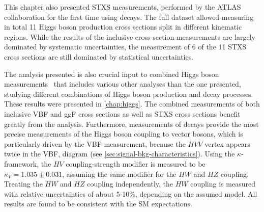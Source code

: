 This chapter also presented STXS measurements, performed by the ATLAS collaboration for the first time using \HWW decays. 
The full \RunTwo dataset allowed measuring in total 11 Higgs boson production cross sections split in different kinematic regions. 
While the results of the inclusive cross-section measurements are largely dominated by systematic uncertainties, the measurement of 6 of the 11 STXS cross sections are still dominated by statistical uncertainties. 

The analysis presented is also crucial input to combined Higgs boson measurements~\cite{NaturePaper} that includes various other analyses than the one presented, studying different combinations of Higgs boson production and decay processes.
These results were presented in \cref{chap:higgs}.
The combined measurements of both inclusive VBF and ggF cross sections as well as STXS cross sections benefit greatly from the \HWW analysis.
Furthermore, measurements of \HWW decays provide the most precise measurements of the Higgs boson coupling to vector bosons, which is particularly driven by the VBF measurement, because the $HVV$ vertex appears twice in the VBF, \HWW diagram (see \cref{sec:signal-bkg-characteristics}). 
Using the $\kappa$-framework, the $HV$ coupling-strength modifier is measured to be $\kappa_{V} = 1.035 \pm 0.031$, assuming the same modifier for the $HW$ and $HZ$ coupling.
Treating the $HW$ and $HZ$ coupling independently, the $HW$ coupling is measured with relative uncertainties of about 5-10\%, depending on the assumed model. All results are found to be consistent with the SM expectations. 





